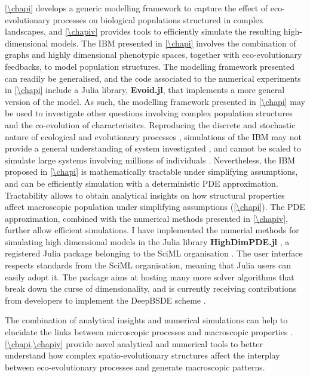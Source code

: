\cref{\chapi} develops a generic modelling framework to capture the effect of eco-evolutionary processes on biological populations structured in complex landscapes, and \cref{\chapiv} provides tools to efficiently simulate the resulting high-dimensional models.
% 
The IBM presented in \cref{\chapi} involves the combination of graphs and highly dimensional phenotypic spaces, together with eco-evolutionary feedbacks, to model population structures. The modelling framework presented can readily be generalised, and the code associated to the numerical experiments in \cref{\chapi} include a Julia library, \textbf{Evoid.jl}, that implements a more general version of the model. %
% 
As such, the modelling framework presented in \cref{\chapi} may be used to investigate other questions involving complex population structures and the co-evolution of characterisitcs.
% 
Reproducing the discrete and stochastic nature of ecological and evolutionary processes \citep{Champagnat2006}, simulations of the IBM may not provide a general understanding of system investigated \xxx, and cannot be scaled to simulate large systems involving millions of individuals \xxx. Nevertheless, the IBM proposed in \cref{\chapi} is mathematically tractable under simplifying assumptions, and can be efficiently simulation with a deterministic PDE approximation.
% 
Tractability allows to obtain analytical insights on how structural properties affect macroscopic population under simplifying assumptions (\cref{\chapi}).
% 
The PDE approximation, combined with the numerical methods presented in \cref{\chapiv}, further allow efficient simulations. 
% 
I have implemented the numerial methods for simulating high dimensional models in the Julia library \textbf{HighDimPDE.jl} \citep{HighDimPDE}, a registered Julia package belonging to the SciML organisation \citep{XXX}.
The user interface respects standards from the SciML organisation, meaning that Julia users can easily adopt it.
%
The package aims at hosting many more solver algorithms that break down the curse of dimensionality, and is currently receiving contributions from developers to implement the DeepBSDE scheme \citep{Han2018}.

The combination of analytical insights and numerical simulations can help to elucidate the links between microscopic processes and macroscopic properties \citep{Levin}.
% 
\cref{\chapi,\chapiv} provide novel analytical and numerical tools to better understand how complex spatio-evolutionary structures affect the interplay between eco-evolutionary processes and generate macroscopic patterns.


